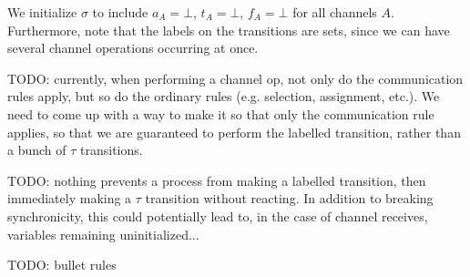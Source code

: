 \documentclass{article}
\begin{document}
We initialize $\sigma$ to include $a_A = \bot$, $t_A = \bot$, $f_A = \bot$ for all channels $A$.
Furthermore, note that the labels on the transitions are sets, since we can have several channel operations occurring at once.

TODO: currently, when performing a channel op, not only do the communication rules apply, but so do the ordinary rules (e.g. selection, assignment, etc.).
We need to come up with a way to make it so that only the communication rule applies, so that we are guaranteed to perform the labelled transition, rather than a bunch of $\tau$ transitions.

TODO: nothing prevents a process from making a labelled transition, then immediately making a $\tau$ transition without reacting.
In addition to breaking synchronicity, this could potentially lead to, in the case of channel receives, variables remaining uninitialized...

TODO: bullet rules
\end{document}
